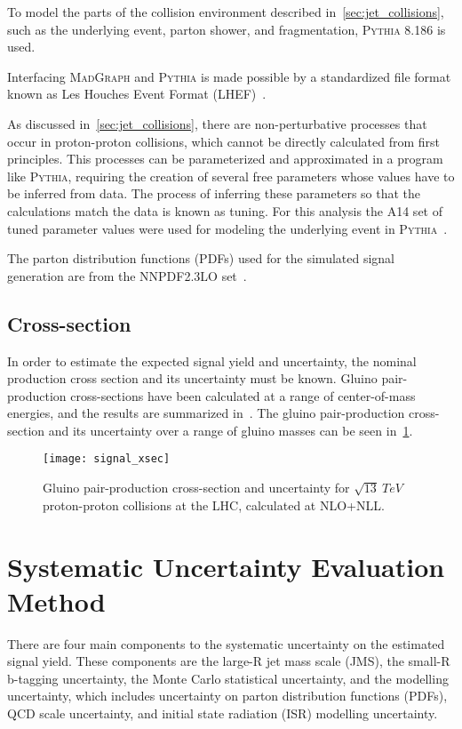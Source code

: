 To model the parts of the collision environment described in~\ref{sec:jet_collisions}, such as the underlying event,
parton shower, and fragmentation, \textsc{Pythia} 8.186 is used\cite{signal-pythia}.

Interfacing \textsc{MadGraph} and \textsc{Pythia} is made possible by a standardized file format known as Les Houches
Event Format (LHEF)~\cite{signal-lhef}.

As discussed in~\ref{sec:jet_collisions}, there are non-perturbative processes that occur in proton-proton collisions,
which cannot be directly calculated from first principles.
This processes can be parameterized and approximated in a program like \textsc{Pythia},
requiring the creation of several free parameters whose values have to be inferred from data.
The process of inferring these parameters so that the calculations match the data is known as tuning.
For this analysis the A14 set of tuned parameter values were used for modeling the underlying event in
\textsc{Pythia}~\cite{signal-pythia-a14,signal-pythia-tunes}.

The parton distribution functions (PDFs) used for the simulated signal generation are from the NNPDF2.3LO
set~\cite{signal-nnpdf}.

\subsection{Cross-section}\label{subsec:signal_cross_section}
In order to estimate the expected signal yield and uncertainty, the nominal production cross section and its uncertainty
must be known.
Gluino pair-production cross-sections have been calculated at a range of center-of-mass energies, and the results
are summarized in~\cite{signal-xsec}.
The gluino pair-production cross-section and its uncertainty over a range of gluino masses can be seen in~\ref{fig:signal_xsec}.

\begin{figure}[!ht]
    \centering
\texttt{[image: signal\_xsec]}
\caption{Gluino pair-production cross-section and uncertainty for $\sqrt{13}~TeV$ proton-proton collisions at the LHC,
calculated at NLO+NLL.
}
\label{fig:signal_xsec}
\end{figure}

\section{Systematic Uncertainty Evaluation Method}\label{sec:signal_systematics_method}
There are four main components to the systematic uncertainty on the
estimated signal yield.
These components are the large-R jet mass scale (JMS), the small-R b-tagging uncertainty, the Monte Carlo statistical
uncertainty, and the modelling uncertainty, which includes uncertainty
on parton distribution functions (PDFs), QCD scale uncertainty, and
initial state radiation (ISR) modelling uncertainty.

